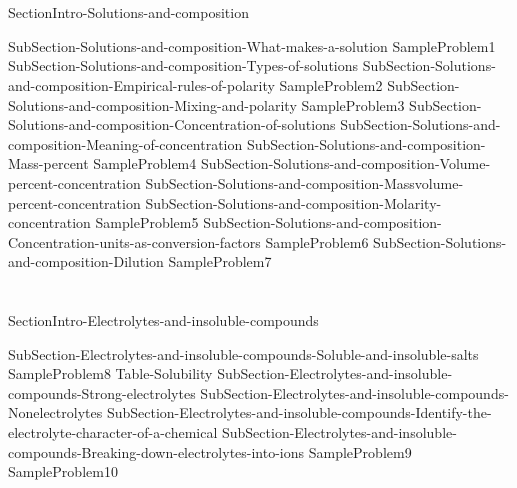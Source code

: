 \documentclass[main.tex]{subfiles} %
\begin{document}
\section{\color{blue!30!black}{Solutions and composition}}
{SectionIntro-Solutions-and-composition}
\sloppy\begin{description}
{SubSection-Solutions-and-composition-What-makes-a-solution}
{SampleProblem1}
{SubSection-Solutions-and-composition-Types-of-solutions}
 \hspace{-9cm}{Figure-Dissolution}
{SubSection-Solutions-and-composition-Empirical-rules-of-polarity}
{SampleProblem2}
{SubSection-Solutions-and-composition-Mixing-and-polarity}
 \hspace{2cm}{Table-Polarity-and-mixing}	
{SampleProblem3}
{SubSection-Solutions-and-composition-Concentration-of-solutions}
{SubSection-Solutions-and-composition-Meaning-of-concentration}
{SubSection-Solutions-and-composition-Mass-percent}
{SampleProblem4}
{SubSection-Solutions-and-composition-Volume-percent-concentration}
{SubSection-Solutions-and-composition-Massvolume-percent-concentration}
{SubSection-Solutions-and-composition-Molarity-concentration}
{SampleProblem5}
{SubSection-Solutions-and-composition-Concentration-units-as-conversion-factors}
{SampleProblem6}
{SubSection-Solutions-and-composition-Dilution}
{SampleProblem7}
\end{description}
\section{\color{blue!30!black}{Electrolytes and insoluble compounds}}
{SectionIntro-Electrolytes-and-insoluble-compounds}
\sloppy \begin{description}
{SubSection-Electrolytes-and-insoluble-compounds-Soluble-and-insoluble-salts}
{SampleProblem8}
{Table-Solubility}
{SubSection-Electrolytes-and-insoluble-compounds-Strong-electrolytes}
{SubSection-Electrolytes-and-insoluble-compounds-Nonelectrolytes}
{SubSection-Electrolytes-and-insoluble-compounds-Identify-the-electrolyte-character-of-a-chemical}
{SubSection-Electrolytes-and-insoluble-compounds-Breaking-down-electrolytes-into-ions}
{SampleProblem9}
 \hspace{-5cm}{Table-Electrolytes	}	
{SampleProblem10}
\end{description}
\end{document}

